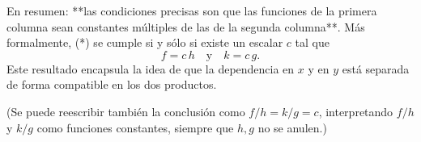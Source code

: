 En resumen: **las condiciones precisas son que las funciones de la primera
columna sean constantes múltiples de las de la segunda columna**. Más
formalmente, (*) se cumple si y sólo si existe un escalar $c$ tal que
\[f = c\,h\quad\text{y}\quad k = c\,g.\]
Este resultado encapsula la idea de que la dependencia en $x$ y en $y$ está
separada de forma compatible en los dos productos.

(Se puede reescribir también la conclusión como $f/h = k/g = c$,
interpretando $f/h$ y $k/g$ como funciones constantes, siempre que $h,g$ no se
anulen.)